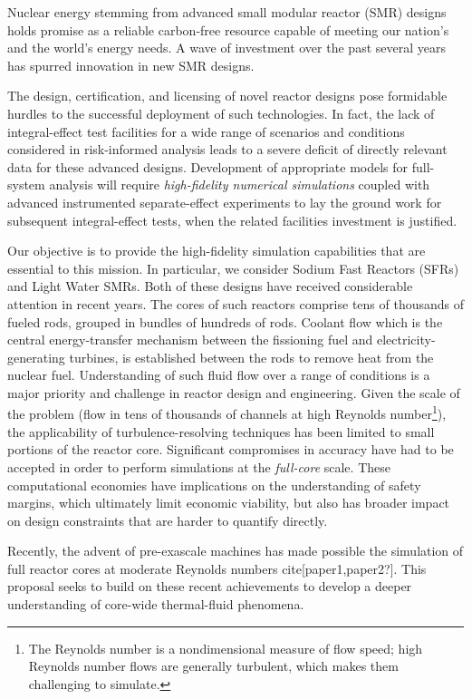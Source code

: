 


Nuclear energy stemming from advanced small modular reactor (SMR) designs
holds promise as a reliable carbon-free resource capable of meeting our
nation's and the world's energy needs.  A wave of investment over the past
several years has spurred innovation in new SMR designs. 

The design, certification, and licensing of novel reactor designs pose
formidable hurdles to the successful deployment of such technologies. In fact,
the lack of integral-effect test facilities for a wide range of scenarios and
conditions considered in risk-informed analysis leads to a severe deficit of
directly relevant data for these advanced designs.  Development of  appropriate
models for full-system analysis will require {\em high-fidelity numerical
simulations} coupled with advanced instrumented separate-effect experiments to
lay the ground work for subsequent integral-effect tests, when the related
facilities investment is justified.

Our objective is to provide the high-fidelity simulation capabilities that are
essential to this mission.  In particular, we consider Sodium Fast Reactors
(SFRs) and Light Water SMRs. Both of these designs have received considerable
attention in recent years. The cores of such reactors comprise tens of
thousands of fueled rods, grouped in bundles of hundreds of rods. Coolant flow
which is the central energy-transfer mechanism between the fissioning fuel and
electricity-generating turbines, is established between the rods to remove heat
from the nuclear fuel.  Understanding of such fluid flow over a range of
conditions is a major priority and challenge in reactor design and engineering.
Given the scale of the problem (flow in tens of thousands of channels at high
Reynolds number\footnote{The Reynolds number is a nondimensional measure of flow
speed; high Reynolds number flows are generally turbulent, which makes them
challenging to simulate.}), the
applicability of turbulence-resolving techniques has been limited to small
portions of the reactor core. Significant compromises in accuracy have had to
be accepted in order to perform simulations at the {\em full-core} scale.
These computational economies have implications on the understanding of safety
margins, which ultimately limit economic viability, but also has broader impact
on design constraints that are harder to quantify directly.

Recently, the advent of pre-exascale machines has made possible the simulation
of full reactor cores at moderate Reynolds numbers cite[paper1,paper2?].  This
proposal seeks to build on these recent achievements to develop a deeper
understanding of core-wide thermal-fluid phenomena.

